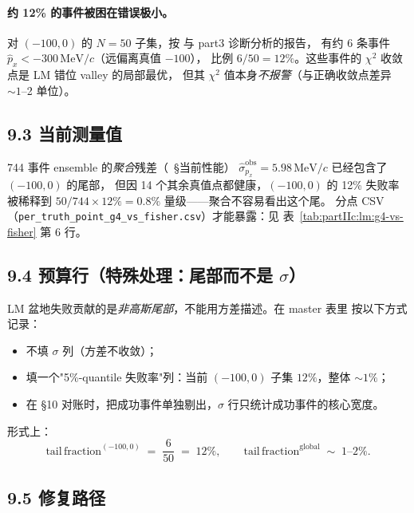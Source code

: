 \paragraph{约 12\% 的事件被困在错误极小。}
对 $(-100, 0)$ 的 $N=50$ 子集，按 \StatusReport{} 与 part3 诊断分析的报告，
有约 $6$ 条事件 $\hat p_x < -300\,\mathrm{MeV}/c$（远偏离真值 $-100$），
比例 $6/50 = 12\%$。这些事件的 $\chi^2$ 收敛点是 LM 错位 valley 的局部最优，
但其 $\chi^2$ 值本身\emph{不报警}（与正确收敛点差异 $\sim 1$--2 单位）。

\subsection*{9.3 当前测量值}

744 事件 ensemble 的\emph{聚合}残差（\StatusReport{}~§当前性能）
$\widehat\sigma_{p_x}^\mathrm{obs} = 5.98\,\mathrm{MeV}/c$ 已经包含了 $(-100, 0)$ 的尾部，
但因 14 个其余真值点都健康，$(-100, 0)$ 的 12\% 失败率被稀释到
$50/744 \times 12\% = 0.8\%$ 量级——聚合不容易看出这个尾。
分点 CSV（\texttt{per\_truth\_point\_g4\_vs\_fisher.csv}）才能暴露：见
表~\ref{tab:partIIc:lm:g4-vs-fisher} 第 6 行。

\subsection*{9.4 预算行（特殊处理：\textbf{尾部}而不是 $\sigma$）}

LM 盆地失败贡献的是\emph{非高斯尾部}，不能用方差描述。在 master 表里
按以下方式记录：
\begin{itemize}
  \item 不填 $\sigma$ 列（方差不收敛）；
  \item 填一个"5\%-quantile 失败率"列：当前 $(-100, 0)$ 子集 $12\%$，整体 $\sim 1\%$；
  \item 在 §10 对账时，把成功事件单独剔出，$\sigma$ 行只统计成功事件的核心宽度。
\end{itemize}
形式上：
\begin{equation}
  \mathrm{tail\,fraction}^{(-100,0)} \;=\; \frac{6}{50} \;=\; 12\%,\qquad
  \mathrm{tail\,fraction}^\mathrm{global} \;\sim\; 1\text{--}2\%.
  \label{eq:partIIc:lm:tail-frac}
\end{equation}

\subsection*{9.5 修复路径}

